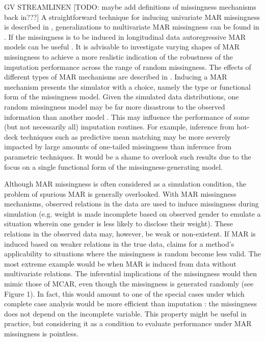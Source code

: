 \documentclass[bimj,fleqn]{w-art}
\begin{document}
GV STREAMLINEN [TODO: maybe add definitions of missingness mechanisms back in???] A straightforward technique for inducing univariate MAR missingness is described in \citet[][\S 3.2.4]{buur18}, generalizations to multivariate MAR missingness can be found in \citet{ampute}. If the missingness is to be induced in longitudinal data autoregressive MAR models can be useful \citep[see e.g.][model 2 and model 3]{shara2015randomly}. It is advisable to investigate varying shapes of MAR missingness to achieve a more realistic indication of the robustness of the imputation performance across the range of random missingness. The effects of different types of MAR mechanisms are described in \citet{scho18}. Inducing a MAR mechanism presents the simulator with a choice, namely the type or functional form of the missingness model. Given the simulated data distributions, one random missingness model may be far more disastrous to the observed information than another model \citep{scho18}. This may influence the performance of some (but not necessarily all) imputation routines. For example, inference from hot-deck techniques such as predictive mean matching \citep{little1988missing, rubin1986statistical} may be more severely impacted by large amounts of one-tailed missingness than inference from parametric techniques. It would be a shame to overlook such results due to the focus on a single functional form of the missingness-generating model.

Although MAR missingness is often considered as a simulation condition, the problem of spurious MAR is generally overlooked. With MAR missingness mechanisms, observed relations in the data are used to induce missingness during simulation (e.g. weight is made incomplete based on observed gender to emulate a situation wherein one gender is less likely to disclose their weight). These relations in the observed data may, however, be weak or non-existent. If MAR is induced based on weaker relations in the true data, claims for a method's applicability to situations where the missingness is random become less valid. The most extreme example would be when MAR is induced from data without multivariate relations. The inferential implications of the missingness would then mimic those of MCAR, even though the missingness is generated randomly (see Figure 1). In fact, this would amount to one of the special cases under which complete case analysis would be more efficient than imputation \citep[see e.g.][\S 2.7]{buur18}: the missingness does not depend on the incomplete variable. This property might be useful in practice, but considering it as a condition to evaluate performance under MAR missingness is pointless. 
\end{document}
